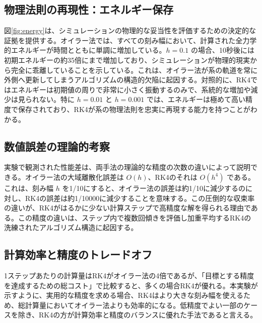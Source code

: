 \documentclass{article}
\begin{document}
\subsection{物理法則の再現性：エネルギー保存}
図\ref{fig:energy}は、シミュレーションの物理的な妥当性を評価するための決定的な証拠を提供する。オイラー法では、すべての刻み幅において、計算された全力学的エネルギーが時間とともに単調に増加している。$h=0.1$ の場合、10秒後には初期エネルギーの約35倍にまで増加しており、シミュレーションが物理的現実から完全に乖離していることを示している。これは、オイラー法が系の軌道を常に外側へ更新してしまうアルゴリズムの構造的欠陥に起因する。対照的に、RK4ではエネルギーは初期値の周りで非常に小さく振動するのみで、系統的な増加や減少は見られない。特に $h=0.01$ と $h=0.001$ では、エネルギーは極めて高い精度で保存されており、RK4が系の物理法則を忠実に再現する能力を持つことがわかる。

\subsection{数値誤差の理論的考察}
実験で観測された性能差は、両手法の理論的な精度の次数の違いによって説明できる。オイラー法の大域離散化誤差は $O(h)$、RK4のそれは $O(h^4)$ である。これは、刻み幅 $h$ を1/10にすると、オイラー法の誤差は約1/10に減少するのに対し、RK4の誤差は約1/10000に減少することを意味する。この圧倒的な収束率の違いが、RK4がはるかに少ない計算ステップで高精度な解を得られる理由である。この精度の違いは、ステップ内で複数回傾きを評価し加重平均するRK4の洗練されたアルゴリズム構造に起因する。

\subsection{計算効率と精度のトレードオフ}
1ステップあたりの計算量はRK4がオイラー法の4倍であるが、「目標とする精度を達成するための総コスト」で比較すると、多くの場合RK4が優れる。本実験が示すように、実用的な精度を求める場合、RK4はより大きな刻み幅を使えるため、総計算量においてオイラー法よりも効率的になる。低精度でよい一部のケースを除き、RK4の方が計算効率と精度のバランスに優れた手法であると言える。
\end{document}
